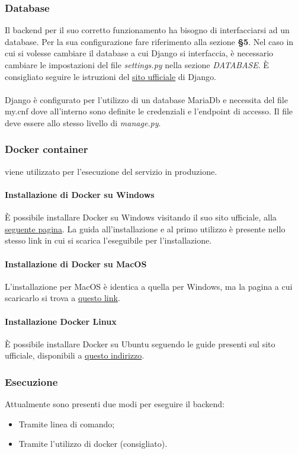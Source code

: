 \subsubsection{Database}
Il backend per il suo corretto funzionamento ha bisogno di interfacciarsi ad un database. Per la sua configurazione fare riferimento alla sezione \textbf{§5}.
Nel caso in cui si volesse cambiare il database a cui Django si interfaccia, è necessario cambiare le impostazioni del file \textit{settings.py} nella sezione \textit{DATABASE}. È consigliato seguire le istruzioni del \href{https://docs.djangoproject.com/en/3.2/ref/databases/}{sito ufficiale} di Django.
\\
\\
Django è configurato per l'utilizzo di un database MariaDb e necessita del file my.cnf dove all'interno sono definite le credenziali e l'endpoint di accesso. Il file deve essere allo stesso livello di \textit{manage.py}.

\subsubsection{Docker container}
 viene utilizzato per l'esecuzione del servizio in produzione.
\paragraph{Installazione di Docker su Windows}
È possibile installare Docker su Windows visitando il suo sito ufficiale, alla \href{https://hub.docker.com/editions/community/docker-ce-desktop-windows}{seguente pagina}. La guida all'installazione e al primo utilizzo è presente nello stesso link in cui si scarica l'eseguibile per l'installazione.
\paragraph{Installazione di Docker su MacOS}
L'installazione per MacOS è identica a quella per Windows, ma la pagina a cui scaricarlo si trova a \href{https://hub.docker.com/editions/community/docker-ce-desktop-mac}{questo link}.
\paragraph{Installazione Docker Linux}
È possibile installare Docker su Ubuntu seguendo le guide presenti sul sito ufficiale, disponibili a \href{https://docs.docker.com/engine/install/ubuntu/}{questo indirizzo}.

\subsubsection{Esecuzione}
Attualmente sono presenti due modi per eseguire il backend:
\begin{itemize}
	\item Tramite linea di comando;
	\item Tramite l'utilizzo di docker (consigliato).
\end{itemize}
